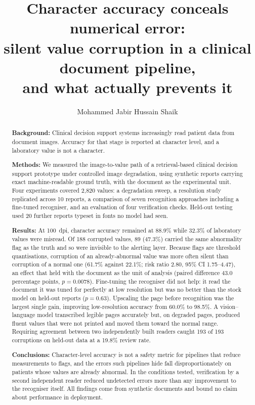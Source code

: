 \documentclass[11pt]{article}
\title{\vspace{-1.5em}\bfseries Character accuracy conceals numerical error:\\
silent value corruption in a clinical document pipeline,\\
and what actually prevents it}
\author[ ]{}
\affil[ ]{\small Author details withheld for double-blind review}
\author[ ]{Mohammed Jabir Hussain Shaik}
\affil[ ]{\small School of Electronics, Electrical Engineering and Computer Science\\
  Queen's University Belfast, United Kingdom\\
  \texttt{mshaik01@qub.ac.uk}}
\date{}
\begin{document}
\maketitle

\begin{abstract}
\noindent
\textbf{Background:} Clinical decision support systems increasingly read patient data from
document images. Accuracy for that stage is reported at character level, and a laboratory value
is not a character.

\noindent \textbf{Methods:} We measured the image-to-value path of a retrieval-based clinical
decision support prototype under controlled image degradation, using synthetic reports carrying
exact machine-readable ground truth, with the document as the experimental unit. Four
experiments covered 2{,}820 values: a degradation sweep, a resolution study replicated across 10
reports, a comparison of seven recognition approaches including a fine-tuned recogniser, and an
evaluation of four verification checks. Held-out testing used 20 further reports typeset in
fonts no model had seen.

\noindent \textbf{Results:} At 100~dpi, character accuracy remained at 88.9\% while 32.3\% of
laboratory values were misread. Of 188 corrupted values, 89 (47.3\%) carried the same
abnormality flag as the truth and so were invisible to the alerting layer. Because flags are
threshold quantisations, corruption of an already-abnormal value was more often silent than
corruption of a normal one (61.7\% against 22.1\%; risk ratio 2.80, 95\% CI 1.75--4.47), an
effect that held with the document as the unit of analysis (paired difference 43.0 percentage
points, $p = 0.0078$). Fine-tuning the recogniser did not help: it read the document it was
tuned for perfectly at low resolution but was no better than the stock model on held-out reports
($p = 0.63$). Upscaling the page before recognition was the largest single gain, improving
low-resolution accuracy from 60.0\% to 98.5\%. A vision--language model transcribed legible
pages accurately but, on degraded pages, produced fluent values that were not printed and moved
them toward the normal range. Requiring agreement between two independently built readers caught
193 of 193 corruptions on held-out data at a 19.8\% review rate.

\noindent \textbf{Conclusions:} Character-level accuracy is not a safety metric for pipelines
that reduce measurements to flags, and the errors such pipelines hide fall disproportionately on
patients whose values are already abnormal. In the conditions tested, verification by a second
independent reader reduced undetected errors more than any improvement to the recogniser itself.
All findings come from synthetic documents and bound no claim about performance in deployment.
\end{abstract}
\end{document}
